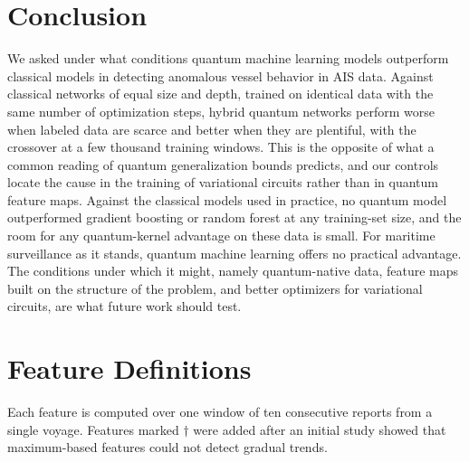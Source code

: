\documentclass[journal]{IEEEtran}
\begin{document}
\section{Conclusion}
\label{sec:conclusion}
We asked under what conditions quantum machine learning models outperform
classical models in detecting anomalous vessel behavior in AIS data. Against
classical networks of equal size and depth, trained on identical data with the
same number of optimization steps, hybrid quantum networks perform worse when
labeled data are scarce and better when they are plentiful, with the crossover
at a few thousand training windows. This is the opposite of what a common
reading of quantum generalization bounds predicts, and our controls locate the
cause in the training of variational circuits rather than in quantum feature
maps. Against the classical models used in practice, no quantum model
outperformed gradient boosting or random forest at any training-set size, and
the room for any quantum-kernel advantage on these data is small. For maritime
surveillance as it stands, quantum machine learning offers no practical
advantage. The conditions under which it might, namely quantum-native data,
feature maps built on the structure of the problem, and better optimizers for
variational circuits, are what future work should test.

\appendices

\section{Feature Definitions}
\label{app:features}
Each feature is computed over one window of ten consecutive reports from a
single voyage. Features marked $\dagger$ were added after an initial study showed
that maximum-based features could not detect gradual trends.
\end{document}
